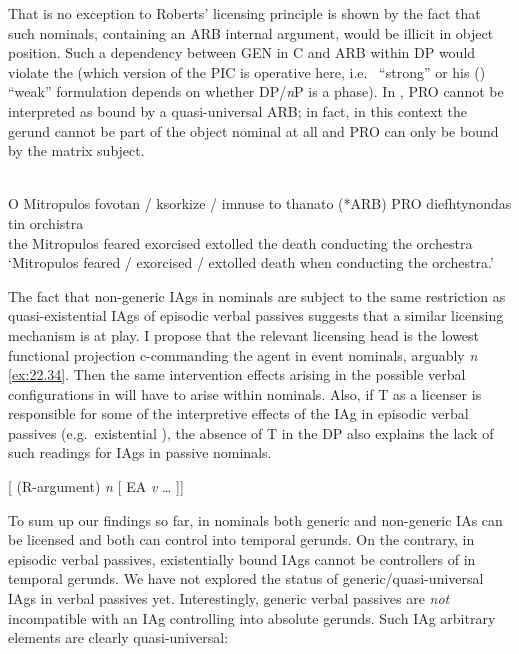 \documentclass[output=paper]{langsci/langscibook}
\begin{document}
That  is no exception to Roberts’ licensing principle is
shown by the fact that such nominals, containing an ARB internal argument,
would be illicit in object position. Such a dependency between GEN in C and ARB
within DP would violate the  (which version of
the \gls{PIC} is operative here, i.e.\  \enquote{strong} or his
(\citeyear{Chomsky2001}) \enquote{weak} formulation depends on whether
DP/\emph{n}P is a phase). In , PRO cannot be interpreted as
bound by a quasi-universal ARB; in fact, in this context the gerund cannot be
part of the object nominal at all and PRO can only be bound by the matrix
subject.

\ea%
\label{ex:22.33} \\
    \gll    O  Mitropulos  fovotan / ksorkize / imnuse  to  thanato (*ARB) PRO    diefhtynondas     tin  orchistra\\
            the  Mitropulos  feared {} exorcised {} extolled  the  death {} {} conducting      the  orchestra\\
    \glt    \enquote*{Mitropulos feared / exorcised / extolled death when conducting the orchestra.}
\z

The fact that non-generic \glspl{IAg} in nominals are subject to the same restriction
as quasi-existential \glspl{IAg} of episodic verbal passives suggests that a similar
licensing mechanism is at play. I propose that the relevant licensing head is
the lowest functional projection c-commanding the agent in event nominals,
arguably \emph{n} \eqref{ex:22.34}.  Then the same intervention effects arising in the
possible verbal configurations in  will have to arise within
nominals. Also, if T as a licenser is responsible for some of the interpretive
effects of the \gls{IAg} in episodic verbal passives (e.g.\ existential ), the
absence of T in the DP also explains the lack of such readings for \glspl{IAg} in
passive nominals.

\ea%
    \label{ex:22.34}
    {}[ (R-argument) \emph{n} [  \gls{EA}  \emph{v} \dots{} ]]
\z

To sum up our findings so far, in  nominals both generic and non-generic
IAs can be licensed and both can control into temporal gerunds. On the
contrary, in episodic verbal passives, existentially bound \glspl{IAg} cannot be
controllers of  in temporal gerunds. We have not explored the
status of generic/quasi-universal \glspl{IAg} in verbal passives yet. Interestingly,
generic verbal passives are \emph{not} incompatible with an \gls{IAg} controlling into
absolute gerunds. Such \gls{IAg} arbitrary elements are
clearly quasi-universal:
\end{document}

